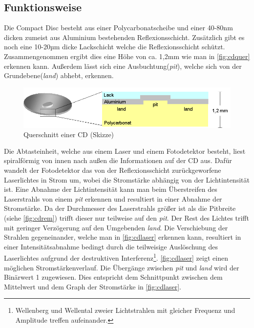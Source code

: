 \subsection{Funktionsweise}
\label{subsec:cdfunktionsweise}

Die Compact Disc besteht aus einer Polycarbonatscheibe und einer 40-80nm dicken
zumeist aus Aluminium bestehenden Reflexionsschicht. Zusätzlich gibt es noch
eine 10-20µm dicke Lackschicht welche die Reflexionsschicht schützt.
Zusammengenommen ergibt dies eine Höhe von ca. 1,2mm wie man in
\autoref{fig:cdquer} erkennen kann. Außerdem lässt sich eine
Ausbuchtung(\textit{pit}), welche sich von der Grundebene(\textit{land}) abhebt,
erkennen. \cite{cfcd}

\begin{figure}[h]
  \begin{center}
      \begin{minipage}[t]{\textwidth}
        \begin{center}
            \includegraphics[height=0.1\textheight]{Bilder/Optische_Datentraeger_Die_Compact_Disc/Funktionsweise/cdquer.png}
            \caption[Querschnitt einer CD (Skizze) \newline \url{http://daten.didaktikchemie.uni-bayreuth.de/umat/cd_dvd/cd_dvd.htm} (zuletzt aufgerufen am 07.08.2015)]{Querschnitt einer CD (Skizze)}
            \label{fig:cdquer}
        \end{center}
      \end{minipage}
  \end{center}
\end{figure}

Die Abtasteinheit, welche aus einem Laser und einem Fotodetektor besteht, liest
spiralförmig von innen nach außen die Informationen auf der CD aus. Dafür
wandelt der Fotodetektor das von der Reflexionsschicht zurückgeworfene
Laserlichtes in Strom um, wobei die Stromstärke abhängig von der Lichtintensität
ist. Eine Abnahme der Lichtintensität kann man beim Überstreifen des
Laserstrahls von einem \textit{pit} erkennen und resultiert in einer Abnahme der
Stromstärke. Da der Durchmesser des Laserstrahls größer ist als die Pitbreite
(siehe \autoref{fig:cdrem}) trifft dieser nur teilweise auf den \textit{pit}.
Der Rest des Lichtes trifft mit geringer Verzögerung auf den Umgebenden
\textit{land}. Die Verschiebung der Strahlen gegeneinander, welche man in
\autoref{fig:cdlaser} erkennen kann, resultiert in einer Intensitätsabnahme
bedingt durch die teilweisige Auslöschung des Laserlichtes aufgrund der
destruktiven Interferenz\footnote{Wellenberg und Wellental zweier Lichtstrahlen
mit gleicher Frequenz und Amplitude treffen aufeinander.}. \autoref{fig:cdlaser}
zeigt einen möglichen Stromstärkenverlauf. Die Übergänge zwischen \textit{pit}
und \textit{land} wird der Binärwert 1 zugewiesen. Dies entspricht dem
Schnittpunkt zwischen dem Mittelwert und dem Graph der Stromstärke in
\autoref{fig:cdlaser}. \cite{cdp}

